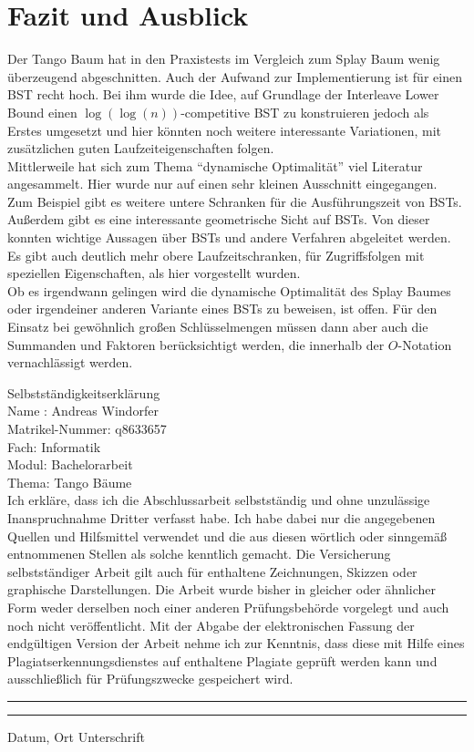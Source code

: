 \documentclass[a4paper,12pt]{article}
\begin{document}
\section{Fazit und Ausblick}
Der Tango Baum hat in den Praxistests im Vergleich zum Splay Baum wenig überzeugend abgeschnitten. Auch der Aufwand zur Implementierung ist für einen BST recht hoch. Bei ihm wurde die Idee, auf Grundlage der Interleave Lower Bound einen $\log\left(\log\left(n\right)\right)$-competitive BST zu konstruieren jedoch als Erstes umgesetzt und hier könnten noch weitere interessante Variationen, mit zusätzlichen guten Laufzeiteigenschaften folgen. \\
Mittlerweile hat sich zum Thema \enquote{dynamische Optimalität} viel Literatur angesammelt. Hier wurde nur auf einen sehr kleinen Ausschnitt eingegangen. Zum Beispiel gibt es  weitere untere Schranken für die Ausführungszeit von BSTs. Außerdem gibt es eine interessante geometrische Sicht auf BSTs. Von dieser konnten wichtige Aussagen über BSTs und andere Verfahren abgeleitet werden. Es gibt auch deutlich mehr obere Laufzeitschranken, für Zugriffsfolgen mit speziellen Eigenschaften, als  hier vorgestellt wurden. \\
Ob es irgendwann gelingen wird die dynamische Optimalität des Splay Baumes oder irgendeiner anderen Variante eines BSTs zu beweisen, ist offen. Für den Einsatz bei gewöhnlich großen Schlüsselmengen müssen dann aber auch die Summanden und Faktoren berücksichtigt werden, die innerhalb der $O$-Notation vernachlässigt werden.


\newpage
\listoffigures
\newpage
\Large
\noindent Selbstständigkeitserklärung\bigskip\\
\normalsize
\noindent Name : Andreas Windorfer\\
Matrikel-Nummer: q8633657\\
Fach: Informatik\\
Modul: Bachelorarbeit\\
Thema: Tango Bäume \bigskip\\


\noindent Ich erkläre, dass ich die Abschlussarbeit selbstständig und ohne unzulässige Inanspruchnahme Dritter verfasst habe. Ich habe dabei nur die angegebenen Quellen und Hilfsmittel verwendet und die aus diesen wörtlich oder sinngemäß entnommenen Stellen als solche kenntlich gemacht. Die Versicherung selbstständiger Arbeit gilt auch für enthaltene Zeichnungen, Skizzen oder graphische Darstellungen. Die Arbeit wurde bisher in gleicher oder ähnlicher Form weder derselben noch einer anderen Prüfungsbehörde vorgelegt und auch noch nicht veröffentlicht. Mit der Abgabe der elektronischen Fassung der endgültigen Version der Arbeit nehme ich zur Kenntnis, dass diese mit Hilfe eines Plagiatserkennungsdienstes auf enthaltene Plagiate geprüft werden kann und ausschließlich für Prüfungszwecke gespeichert wird.\\

\vspace{50pt}
\noindent\rule{5cm}{.4pt}\hfill\rule{5cm}{.4pt}\par
\noindent Datum, Ort \hfill Unterschrift
                       



\newpage


\end{document}

